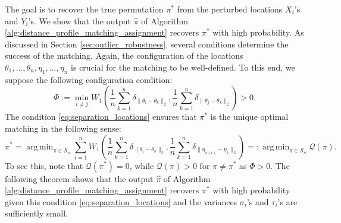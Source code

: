 \documentclass[11pt,letterpaper]{article}
\theoremstyle{definition}
\numberwithin{equation}{section}
\newcommand{\cQ}{\mathcal{Q}}
\newcommand{\cS}{\mathcal{S}}
\DeclareMathOperator*{\argmin}{arg\,min} %
\begin{document}
The goal is to recover the true permutation $\pi^\ast$ from the perturbed locations $X_i$'s and $Y_i$'s. We show that the output $\hat{\pi}$ of Algorithm \ref{alg:distance_profile_matching_assignment} recovers $\pi^\ast$ with high probability. As discussed in Section \ref{sec:outlier_robustness}, several conditions determine the success of the matching. Again, the configuration of the locations $\theta_1, \ldots, \theta_n, \eta_1, \ldots, \eta_n$ is crucial for the matching to be well-defined. To this end, we suppose the following configuration condition:
\begin{equation}
    \label{eq:separation_locations}
    \Phi := \min_{i \neq j} W_1\left(\frac{1}{n} \sum_{k = 1}^{n} \delta_{\|\theta_i - \theta_k\|_2}, \frac{1}{n} \sum_{k = 1}^{n} \delta_{\|\theta_j - \theta_k\|_2}\right) > 0.
\end{equation}
The condition \eqref{eq:separation_locations} ensures that $\pi^\ast$ is the unique optimal matching in the following sense:
\begin{equation*}
    \pi^\ast = \argmin_{\pi \in \cS_n} \sum_{i = 1}^{n} W_1\left(\frac{1}{n} \sum_{k = 1}^{n} \delta_{\|\theta_i - \theta_k\|_2}, \frac{1}{n} \sum_{k = 1}^{n} \delta_{\|\eta_{\pi(i)} - \eta_k\|_2}\right) =: \argmin_{\pi \in \cS_n} \cQ(\pi).
\end{equation*}
To see this, note that $\cQ(\pi^\ast) = 0$, while $\cQ(\pi) > 0$ for $\pi \neq \pi^\ast$ as $\Phi > 0$. The following theorem shows that the output $\hat{\pi}$ of Algorithm \ref{alg:distance_profile_matching_assignment} recovers $\pi^\ast$ with high probability given this condition \eqref{eq:separation_locations} and the variances $\sigma_i$'s and $\tau_i$'s are sufficiently small.
\end{document}
